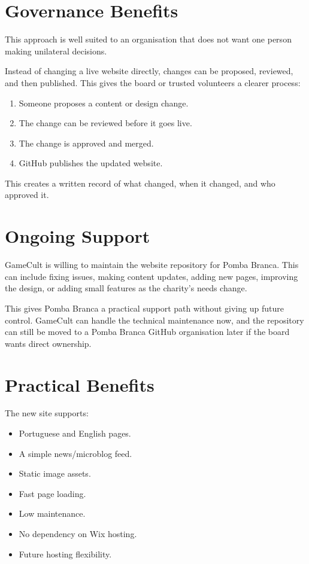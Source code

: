 \documentclass[10pt]{article}
\newcommand{\sectionrule}{\vspace{-0.45em}{\color{PombaBlue}\hrule height 0.8pt}\vspace{0.55em}}
\begin{document}
\section*{Governance Benefits}
\sectionrule

This approach is well suited to an organisation that does not want one person making unilateral decisions.

Instead of changing a live website directly, changes can be proposed, reviewed, and then published. This gives the board or trusted volunteers a clearer process:

\begin{enumerate}
  \item Someone proposes a content or design change.
  \item The change can be reviewed before it goes live.
  \item The change is approved and merged.
  \item GitHub publishes the updated website.
\end{enumerate}

This creates a written record of what changed, when it changed, and who approved it.

\section*{Ongoing Support}
\sectionrule

GameCult is willing to maintain the website repository for Pomba Branca. This can include fixing issues, making content updates, adding new pages, improving the design, or adding small features as the charity's needs change.

This gives Pomba Branca a practical support path without giving up future control. GameCult can handle the technical maintenance now, and the repository can still be moved to a Pomba Branca GitHub organisation later if the board wants direct ownership.

\clearpage

\section*{Practical Benefits}
\sectionrule

The new site supports:

\begin{itemize}
  \item Portuguese and English pages.
  \item A simple news/microblog feed.
  \item Static image assets.
  \item Fast page loading.
  \item Low maintenance.
  \item No dependency on Wix hosting.
  \item Future hosting flexibility.
\end{itemize}
\end{document}
